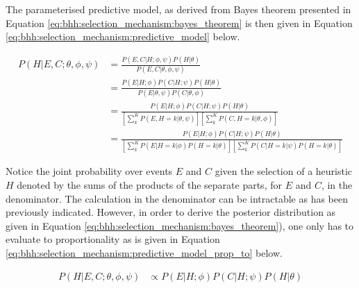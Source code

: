 The parameterised predictive model, as derived from Bayes theorem presented in Equation \ref{eq:bhh:selection_mechanism:bayes_theorem} is then given in Equation \ref{eq:bhh:selection_mechanism:predictive_model} below.

\begin{equation}
      \label{eq:bhh:selection_mechanism:predictive_model}
      \begin{split}
            P(H \vert E, C;  \theta, \phi, \psi)
            &= \frac{
                  P(E, C \vert H;  \phi, \psi)  P(H \vert \theta)
            }{
                  P(E, C \vert \theta, \phi, \psi)
            } \\
            &= \frac{
                  P(E \vert H;  \phi)  P(C \vert H;  \psi) P(H \vert \theta)
            }{
                  P(E \vert \theta, \psi) P(C \vert \theta, \phi)
            } \\
            &= \frac{
                  P(E \vert H;  \phi)  P(C \vert H;  \psi) P(H \vert \theta)
            }{
                  \left[ \sum_{k}^{K} P(E, H=k \vert \theta, \psi) \right] \left[ \sum_{k}^{K}  P(C, H=k \vert \theta, \phi) \right]
            } \\
            &= \frac{
                  P(E \vert H;  \phi)  P(C \vert H;  \psi) P(H \vert \theta)
            }{
                  \left[ \sum_{k}^{K} P(E \vert H=k \vert \phi) P(H=k \vert \theta) \right] \left[ \sum_{k}^{K} P(C \vert H=k \vert \psi) P(H=k \vert \theta) \right]
            }
      \end{split}
\end{equation}

Notice the joint probability over events $E$ and $C$ given the selection of a heuristic $H$ denoted by the sums of the products of the separate parts, for $E$ and $C$, in the denominator. The calculation in the denominator can be intractable as has been previously indicated. However, in order to derive the posterior distribution as given in Equation \ref{eq:bhh:selection_mechanism:bayes_theorem}), one only has to evaluate to proportionality as is given in Equation \ref{eq:bhh:selection_mechanism:predictive_model_prop_to} below.

\begin{equation}
      \label{eq:bhh:selection_mechanism:predictive_model_prop_to}
      \begin{split}
            P(H \vert E, C;  \theta, \phi, \psi) &\propto P(E \vert H;  \phi)  P(C \vert H;  \psi) P(H \vert \theta)
      \end{split}
\end{equation}

